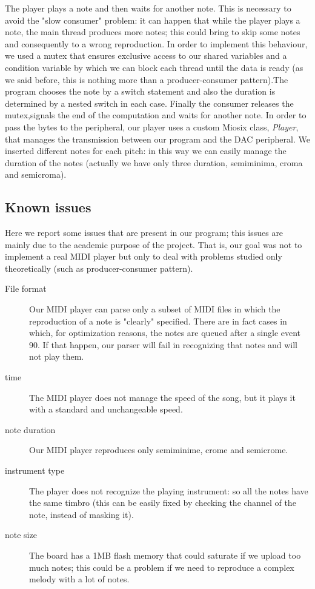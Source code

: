 \documentclass[12pt]{article}
\begin{document}
The player plays a note and then waits for another note. This is necessary to avoid the "slow consumer" problem: it can happen that while the player plays a note, the main thread produces more notes; this could bring to skip some notes and consequently to a wrong reproduction. In order to implement this behaviour, we used a mutex that ensures exclusive access to our shared variables and a condition variable by which we can block each thread until the data is ready (as we said before, this is nothing more than a producer-consumer pattern).The program chooses the note by a switch statement and also the duration is determined by a nested switch in each case. Finally the consumer releases the mutex,signals the end of the computation and waits for another note.\newline
In order to pass the bytes to the peripheral, our player uses a custom Miosix class, \textit{Player}, that manages the transmission between our program and the DAC peripheral. We inserted different notes for each pitch: in this way we can easily manage the duration of the notes (actually we have only three duration, semiminima, croma and semicroma).

\subsection{Known issues}
Here we report some issues that are present in our program; this issues are mainly due to the academic purpose of the project. That is, our goal was not to implement a real MIDI player but only to deal with problems studied only theoretically (such as producer-consumer pattern).
\begin{description}
	\item[File format] Our MIDI player can parse only a subset of MIDI files in which the reproduction of a note is "clearly" specified. There are in fact cases in which, for optimization reasons, the notes are queued after a single event 90. If that happen, our parser will fail in recognizing that notes and will not play them.
	\item[time] The MIDI player does not manage the speed of the song, but it plays it with a standard and unchangeable speed.
	\item[note duration] Our MIDI player reproduces only semiminime, crome and semicrome.
	\item[instrument type] The player does not recognize the playing instrument: so all the notes have the same timbro (this can be easily fixed by checking the channel of the note, instead of masking it).
	\item[note size] The board has a 1MB flash memory that could saturate if we upload too much notes; this could be a problem if we need to reproduce a complex melody with a lot of notes.
\end{description}
\end{document}

